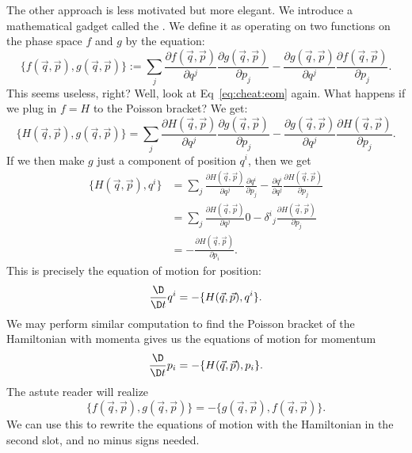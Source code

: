 The other approach is less motivated but more elegant. We introduce a
mathematical gadget called the . We define it as
operating on two functions on the phase space $f$ and $g$ by the equation:
\begin{equation}
  \{f(\vec{q},\vec{p}), g(\vec{q},\vec{p})\}
  := \sum_{j}\frac{\partial f(\vec{q},\vec{p})}{\partial q^{j}}\frac{\partial g(\vec{q},\vec{p})}{\partial p_{j}}
  -\frac{\partial g(\vec{q},\vec{p})}{\partial q^{j}}\frac{\partial f(\vec{q},\vec{p})}{\partial p_{j}}.
\end{equation}
This seems useless, right? Well, look at Eq~\eqref{eq:cheat:eom} again.
What happens if we plug in $f=H$ to the Poisson bracket? We get:
\begin{equation}
  \{H(\vec{q},\vec{p}), g(\vec{q},\vec{p})\}
  = \sum_{j}\frac{\partial H(\vec{q},\vec{p})}{\partial q^{j}}\frac{\partial g(\vec{q},\vec{p})}{\partial p_{j}}
  -\frac{\partial g(\vec{q},\vec{p})}{\partial q^{j}}\frac{\partial H(\vec{q},\vec{p})}{\partial p_{j}}.
\end{equation}
If we then make $g$ just a component of position $q^{i}$, then we get
\begin{subequations}
\begin{align}
  \{H(\vec{q},\vec{p}), q^{i}\}
  &= \sum_{j}\frac{\partial H(\vec{q},\vec{p})}{\partial q^{j}}\frac{\partial q^{i}}{\partial p_{j}}
  -\frac{\partial q^{i}}{\partial q^{j}}\frac{\partial H(\vec{q},\vec{p})}{\partial p_{j}}\\
  &= \sum_{j}\frac{\partial H(\vec{q},\vec{p})}{\partial q^{j}}0
  -{\delta^{i}}_{j}\frac{\partial H(\vec{q},\vec{p})}{\partial p_{j}}\\
  &= -\frac{\partial H(\vec{q},\vec{p})}{\partial p_{i}}.
\end{align}
\end{subequations}
This is precisely the equation of motion for position:
\begin{equation}
\frac{\D}{\D t}q^{i} = -\{H(\vec{q},\vec{p}), q^{i}\}.
\end{equation}
We may perform similar computation to find the Poisson bracket of the
Hamiltonian with momenta gives us the equations of motion for momentum
\begin{equation}
\frac{\D}{\D t}p_{i} = -\{H(\vec{q},\vec{p}), p_{i}\}.
\end{equation}
The astute reader will realize
\begin{equation}
\{f(\vec{q},\vec{p}), g(\vec{q},\vec{p})\}
=-\{g(\vec{q},\vec{p}), f(\vec{q},\vec{p})\}.
\end{equation}
We can use this to rewrite the equations of motion with the Hamiltonian
in the second slot, and no minus signs needed.

